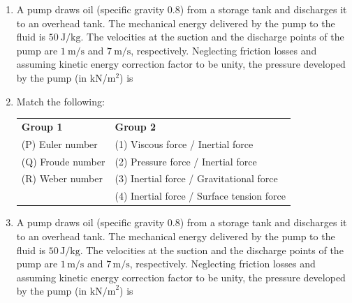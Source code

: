 \documentclass[journal,12pt,onecolumn]{IEEEtran}
\theoremstyle{remark}
\begin{document}
\begin{enumerate}
\item A pump draws oil (specific gravity $0.8$) from a storage tank and discharges it to an overhead tank.  
The mechanical energy delivered by the pump to the fluid is $50 \ \text{J/kg}$.  
The velocities at the suction and the discharge points of the pump are $1 \ \text{m/s}$ and $7 \ \text{m/s}$, respectively.  
Neglecting friction losses and assuming kinetic energy correction factor to be unity, the pressure developed by the pump (in kN/m$^2$) is 
\hfill{}
\begin{enumerate}
\end{enumerate}

\item Match the following:  

\begin{tabular}{ll}
\textbf{Group 1} & \textbf{Group 2} \\
(P) Euler number & (1) Viscous force / Inertial force \\
(Q) Froude number & (2) Pressure force / Inertial force \\
(R) Weber number & (3) Inertial force / Gravitational force \\
& (4) Inertial force / Surface tension force
\end{tabular}
\hfill{}
\begin{enumerate}
\end{enumerate}

\item A pump draws oil (specific gravity 0.8) from a storage tank and discharges it to an overhead tank. The mechanical energy delivered by the pump to the fluid is $50 \, \text{J/kg}$. The velocities at the suction and the discharge points of the pump are $1 \, \text{m/s}$ and $7 \, \text{m/s}$, respectively. Neglecting friction losses and assuming kinetic energy correction factor to be unity, the pressure developed by the pump (in $\text{kN/m}^2$) is
\hfill{}
\begin{enumerate}[label=(\Alph*)]
\end{enumerate}


\end{enumerate}
\end{document}
